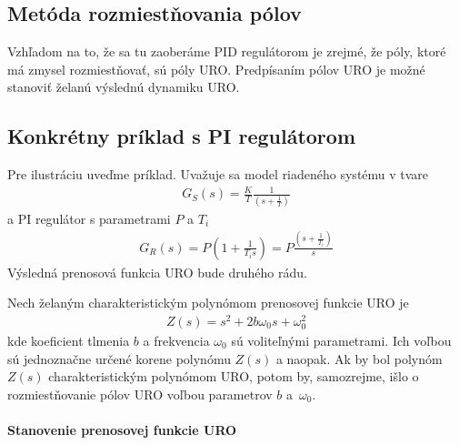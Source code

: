 \documentclass[a4paper, 10pt, ]{article}
\begin{document}
\subsection{Metóda rozmiestňovania pólov}
\label{Metóda rozmiestňovania pólov}

Vzhľadom na to, že sa tu zaoberáme PID regulátorom je zrejmé, že póly, ktoré má zmysel rozmiestňovať, sú póly URO. Predpísaním pólov URO je možné stanoviť želanú výslednú dynamiku URO.


\subsection{Konkrétny príklad s PI regulátorom}

Pre ilustráciu uveďme príklad. Uvažuje sa model riadeného systému v tvare
\begin{align}
    G_S(s) = \frac{K}{T} \frac{1}{ \left(s+\frac{1}{T}\right)}
\end{align}
a PI regulátor s parametrami $P$ a $T_i$ 
\begin{align}
    G_R(s) = P \left( 1 + \frac{1}{T_i s}\right) = P \frac{ \left(s+\frac{1}{T_i}\right) }{s}
\end{align}
Výsledná prenosová funkcia URO bude druhého rádu. 

Nech želaným charakteristickým polynómom prenosovej funkcie URO je
\begin{align}
    Z(s) = s^2 + 2 b \omega_0 s + \omega_0^2
\end{align}
kde koeficient tlmenia $b$ a frekvencia $\omega_0$ sú voliteľnými parametrami. Ich voľbou sú jednoznačne určené korene polynómu $Z(s)$ a naopak. Ak by bol polynóm $Z(s)$ charakteristickým polynómom URO, potom by, samozrejme, išlo o rozmiestňovanie pólov URO voľbou parametrov $b$ a~$\omega_0$.







\paragraph{Stanovenie prenosovej funkcie URO}
\end{document}
